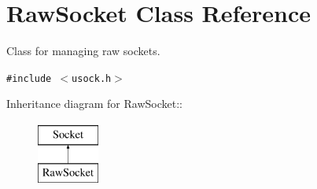 \hypertarget{classRawSocket}{
\section{RawSocket Class Reference}
\label{classRawSocket}
}
Class for managing raw sockets.  


{\tt \#include $<$usock.h$>$}

Inheritance diagram for RawSocket::\begin{figure}[H]
\begin{center}
\leavevmode
\includegraphics[height=2cm]{classRawSocket}
\end{center}
\end{figure}

